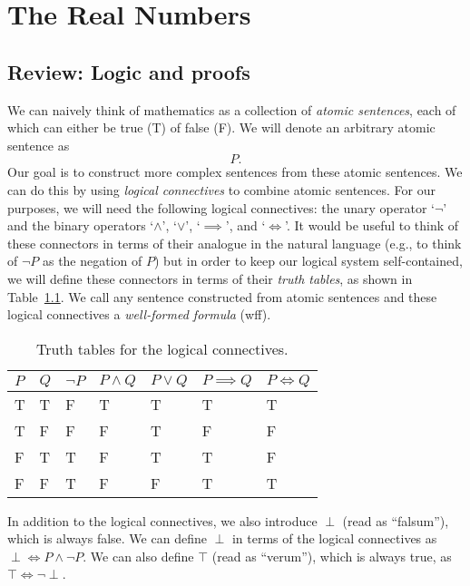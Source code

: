 \chapter{The Real Numbers}

\section{Review: Logic and proofs}

We can naively think of mathematics as a collection of \emph{atomic sentences}, each of which can either be true (T) of false (F). We will denote an arbitrary atomic sentence as
\begin{equation*}
    P.
\end{equation*}
Our goal is to construct more complex sentences from these atomic sentences. We can do this by using \emph{logical connectives} to combine atomic sentences. For our purposes, we will need the following logical connectives: the unary operator `\(\neg\)' and the binary operators `\(\wedge\)', `\(\vee\)', `\(\implies\)', and `\(\iff\)'. It would be useful to think of these connectors in terms of their analogue in the natural language (e.g., to think of \(\neg P\) as the negation of \(P\)) but in order to keep our logical system self-contained, we will define these connectors in terms of their \emph{truth tables}, as shown in Table~\ref{tab:truth-tables}. We call any sentence constructed from atomic sentences and these logical connectives a \emph{well-formed formula} (wff).

\begin{table}
    \begin{tabular}{lllllll}
        \(P\) & \(Q\) & \(\neg P\) & \(P \wedge Q\) & \(P \vee Q\) & \(P \implies Q\) & \(P \iff Q\) \\
        \hline
        T & T & F & T & T & T & T \\
        T & F & F & F & T & F & F \\
        F & T & T & F & T & T & F \\
        F & F & T & F & F & T & T
    \end{tabular}
    \caption{Truth tables for the logical connectives.}
    \label{tab:truth-tables}
\end{table}

In addition to the logical connectives, we also introduce \(\perp\) (read as ``falsum''), which is always false. We can define \(\perp\) in terms of the logical connectives as \(\perp \iff P \wedge \neg P\). We can also define \(\top\) (read as ``verum''), which is always true, as \(\top \iff \neg \perp\).

